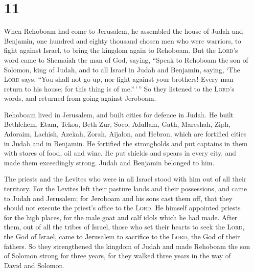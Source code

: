 \hypertarget{section-10}{%
\section{11}\label{section-10}}

 When Rehoboam had come to Jerusalem, he assembled the
house of Judah and Benjamin, one hundred and eighty thousand chosen men
who were warriors, to fight against Israel, to bring the kingdom again
to Rehoboam.  But the \textsc{Lord}'s word came to
Shemaiah the man of God, saying,  ``Speak to Rehoboam the
son of Solomon, king of Judah, and to all Israel in Judah and Benjamin,
saying,  `The \textsc{Lord} says, ``You shall not go up,
nor fight against your brothers! Every man return to his house; for this
thing is of me.''\,'\,'' So they listened to the \textsc{Lord}'s words,
and returned from going against Jeroboam.

 Rehoboam lived in Jerusalem, and built cities for defence
in Judah.  He built Bethlehem, Etam, Tekoa, 
Beth Zur, Soco, Adullam,  Gath, Mareshah, Ziph,
 Adoraim, Lachish, Azekah,  Zorah, Aijalon,
and Hebron, which are fortified cities in Judah and in Benjamin.
 He fortified the strongholds and put captains in them
with stores of food, oil and wine.  He put shields and
spears in every city, and made them exceedingly strong. Judah and
Benjamin belonged to him.

 The priests and the Levites who were in all Israel stood
with him out of all their territory.  For the Levites
left their pasture lands and their possessions, and came to Judah and
Jerusalem; for Jeroboam and his sons cast them off, that they should not
execute the priest's office to the \textsc{Lord}.  He
himself appointed priests for the high places, for the male goat and
calf idols which he had made.  After them, out of all the
tribes of Israel, those who set their hearts to seek the \textsc{Lord},
the God of Israel, came to Jerusalem to sacrifice to the \textsc{Lord},
the God of their fathers.  So they strengthened the
kingdom of Judah and made Rehoboam the son of Solomon strong for three
years, for they walked three years in the way of David and Solomon.

